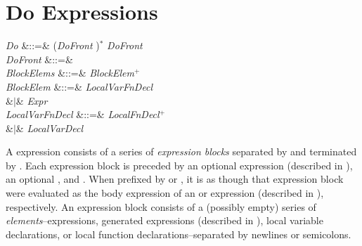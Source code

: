 %
%
%
%

\section{Do Expressions}

\begin{Grammar}
\emph{Do} &::=& (\emph{DoFront} )$^*$ \emph{DoFront} \\

\emph{DoFront} &::=&    \\

\emph{BlockElems} &::=& \emph{BlockElem}$^+$ \\

\emph{BlockElem}
&::=& \emph{LocalVarFnDecl}\\
&$|$& \emph{Expr}\\

\emph{LocalVarFnDecl}
&::=& \emph{LocalFnDecl}$^+$\\
&$|$& \emph{LocalVarDecl}\\

\end{Grammar}

A  expression consists of a series of \emph{expression blocks}
separated by  and
terminated by .  Each expression block is preceded by
an optional  expression (described in ),
an optional , and
.  When prefixed by  or , it is as though
that expression block were evaluated as the body expression of an  or
 expression (described in ), respectively.
An expression block
consists of a (possibly empty) series of \emph{elements}--expressions,
generated expressions (described in ),
local variable declarations, or local function declarations--separated
by newlines or semicolons.

